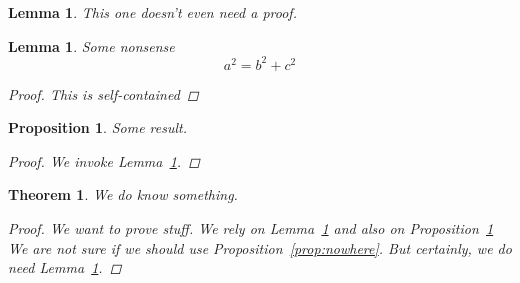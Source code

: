 \documentclass{article}
\theoremstyle{definition}
\theoremstyle{plain}
\newtheorem{theorem}[defn]{Theorem}
\newtheorem{proposition}[defn]{Proposition}
\newtheorem{lemma}[defn]{Lemma}
\theoremstyle{remark}
\begin{document}
\begin{lemma} \label{lemma:zero}
This one doesn't even need a proof.
\end{lemma}

\begin{lemma} \label{lemma:first}
Some nonsense
\[a^2 = b^2+c^2\]
\begin{proof}
This is self-contained
\end{proof}
\end{lemma}

\begin{proposition} \label{prop:second}
Some result.
\begin{proof}
We invoke Lemma~\ref{lemma:zero}.
\end{proof}
\end{proposition}

\begin{theorem} \label{thm:main}
We do know something.
\begin{proof}
We want to prove stuff. We rely on Lemma~\ref{lemma:first} and also on Proposition~\ref{prop:second} %
We are not sure if we should use Proposition~\ref{prop:nowhere}.
But certainly, we do need Lemma~\ref{lemma:first}.
\end{proof}
\end{theorem}
\end{document}
